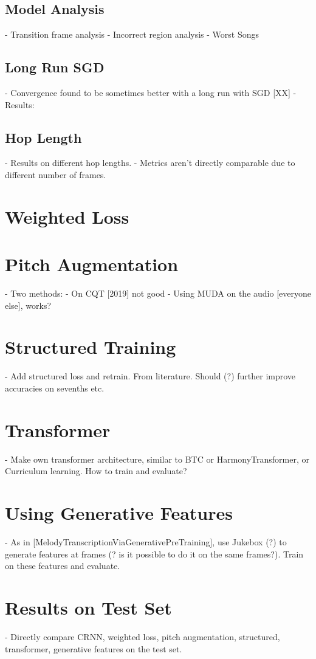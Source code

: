 \subsection{Model Analysis}
- Transition frame analysis
- Incorrect region analysis
- Worst Songs
\subsection{Long Run SGD}
- Convergence found to be sometimes better with a long run with SGD [XX]
- Results:
\subsection{Hop Length}
- Results on different hop lengths.
- Metrics aren't directly comparable due to different number of frames.

\section{Weighted Loss}

\section{Pitch Augmentation}
- Two methods:
- On CQT [2019] not good
- Using MUDA on the audio [everyone else], works?

\section{Structured Training}

- Add structured loss and retrain. From literature. Should (?) further improve accuracies on sevenths etc.

\section{Transformer}

- Make own transformer architecture, similar to BTC or HarmonyTransformer, or Curriculum learning. How to train and evaluate?

\section{Using Generative Features}

- As in [MelodyTranscriptionViaGenerativePreTraining], use Jukebox (?) to generate features at frames (? is it possible to do it on the same frames?). Train on these features and evaluate.

\section{Results on Test Set}

- Directly compare CRNN, weighted loss, pitch augmentation, structured, transformer, generative features on the test set.